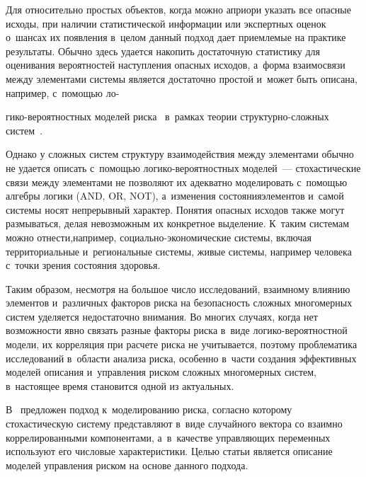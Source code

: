 \begin{multicols}{2}
Для 
относительно прос\-тых объектов, когда можно априори указать все опасные 
исходы, при наличии статистической информации или экспертных оценок 
о~шан\-сах их по\-яв\-ле\-ния в~целом данный подход дает приемлемые на практике 
результаты. 
%
Обычно здесь удается накопить достаточную статистику для 
оценивания вероятностей на\-ступ\-ле\-ния опас\-ных исходов, а~форма взаимосвязи 
между элементами сис\-те\-мы является до\-ста\-точ\-но прос\-той и~может быть 
описана, например, с~по\-мощью ло-\linebreak\vspace*{-12pt}

\pagebreak

\noindent
ги\-ко-ве\-ро\-ят\-ност\-ных моделей 
риска~\cite{7-t} в~рам\-ках тео\-рии струк\-тур\-но-слож\-ных сис\-тем~\cite{8-t}.
  
  Однако у сложных систем структуру взаимодействия между элементами 
обычно не удается описать с~по\-мощью ло\-ги\-ко-ве\-ро\-ят\-ност\-ных моделей~--- 
стохастические связи между элементами не позволяют их адекватно 
моделировать с~по\-мощью алгебры логики (AND, OR, NOT), а~изменения 
со\-сто\-яния\linebreak элементов и~самой сис\-те\-мы носят непрерывный харак\-тер. Понятия 
опас\-ных исходов также могут размываться, делая невозможным их конкретное 
выделение. К~таким сис\-те\-мам мож\-но отнес\-ти,\linebreak например, 
со\-ци\-аль\-но-эко\-но\-ми\-че\-ские сис\-те\-мы, 
вклю\-чая территориальные и~региональные сис\-те\-мы, 
живые сис\-те\-мы, например человека с~точ\-ки зрения со\-сто\-яния здоровья.
  
  Таким образом, несмотря на большое число исследований, взаимному 
влиянию элементов и~различных фак\-то\-ров рис\-ка на без\-опас\-ность слож\-ных 
многомерных сис\-тем уделяется недостаточно внимания. Во многих случаях, 
когда нет воз\-мож\-ности явно связать разные факторы рис\-ка в~виде  
ло\-ги\-ко-ве\-ро\-ят\-ност\-ной модели, их корреляция при расчете рис\-ка не 
учитывается, поэтому проб\-ле\-ма\-ти\-ка исследований в~об\-ласти анализа рис\-ка, 
особенно в~час\-ти со\-зда\-ния эффективных моделей описания и~управ\-ле\-ния 
рис\-ком слож\-ных многомерных сис\-тем, в~на\-сто\-ящее время становится одной из 
актуальных.
  
  В~\cite{9-t, 10-t} предложен подход к~моделированию риска, со\-глас\-но 
которому стохастическую сис\-те\-му представляют в~виде случайного вектора со 
взаимно коррелированными компонентами, а~в~качестве управ\-ля\-ющих 
переменных используют его чис\-ло\-вые характеристики. Целью \mbox{статьи} является 
описание моделей управ\-ле\-ния рис\-ком на основе данного подхода.


\end{multicols}
